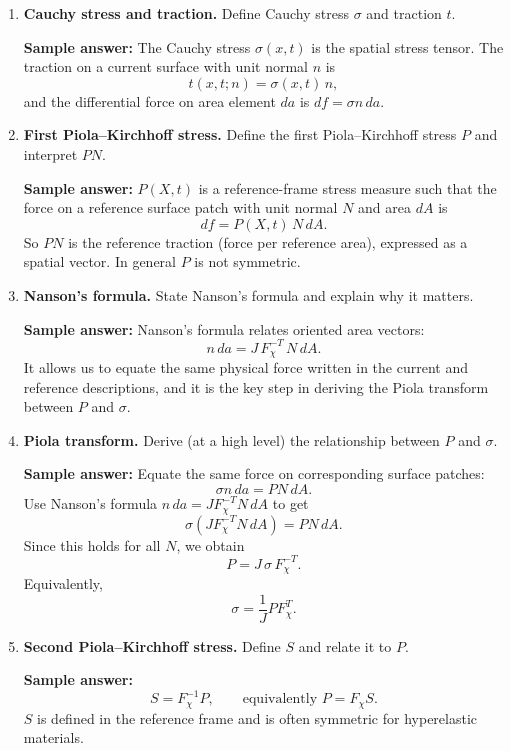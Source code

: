 \documentclass[12pt]{article}
\begin{document}
\begin{enumerate}
\item \textbf{Cauchy stress and traction.}
Define Cauchy stress $\sigma$ and traction $t$.

\textbf{Sample answer:}
The Cauchy stress $\sigma(x,t)$ is the spatial stress tensor.
The traction on a current surface with unit normal $n$ is
\[
t(x,t;n) = \sigma(x,t)\, n,
\]
and the differential force on area element $da$ is $df=\sigma n\, da$.

\item \textbf{First Piola--Kirchhoff stress.}
Define the first Piola--Kirchhoff stress $P$ and interpret $P N$.

\textbf{Sample answer:}
$P(X,t)$ is a reference-frame stress measure such that the force on a reference surface patch
with unit normal $N$ and area $dA$ is
\[
df = P(X,t)\,N\, dA.
\]
So $P N$ is the reference traction (force per reference area), expressed as a spatial vector.
In general $P$ is not symmetric.

\item \textbf{Nanson's formula.}
State Nanson's formula and explain why it matters.

\textbf{Sample answer:}
Nanson's formula relates oriented area vectors:
\[
n\, da = J\,F_\chi^{-T}\,N\, dA.
\]
It allows us to equate the same physical force written in the current and reference descriptions,
and it is the key step in deriving the Piola transform between $P$ and $\sigma$.

\item \textbf{Piola transform.}
Derive (at a high level) the relationship between $P$ and $\sigma$.

\textbf{Sample answer:}
Equate the same force on corresponding surface patches:
\[
\sigma n\, da = P N\, dA.
\]
Use Nanson's formula $n\, da = JF_\chi^{-T}N\, dA$ to get
\[
\sigma(JF_\chi^{-T}N\, dA)=PN\, dA.
\]
Since this holds for all $N$, we obtain
\[
P = J\,\sigma\,F_\chi^{-T}.
\]
Equivalently,
\[
\sigma = \frac{1}{J}P F_\chi^{T}.
\]

\item \textbf{Second Piola--Kirchhoff stress.}
Define $S$ and relate it to $P$.

\textbf{Sample answer:}
\[
S = F_\chi^{-1}P,\qquad \text{equivalently } P = F_\chi S.
\]
$S$ is defined in the reference frame and is often symmetric for hyperelastic materials.


\end{enumerate}
\end{document}
